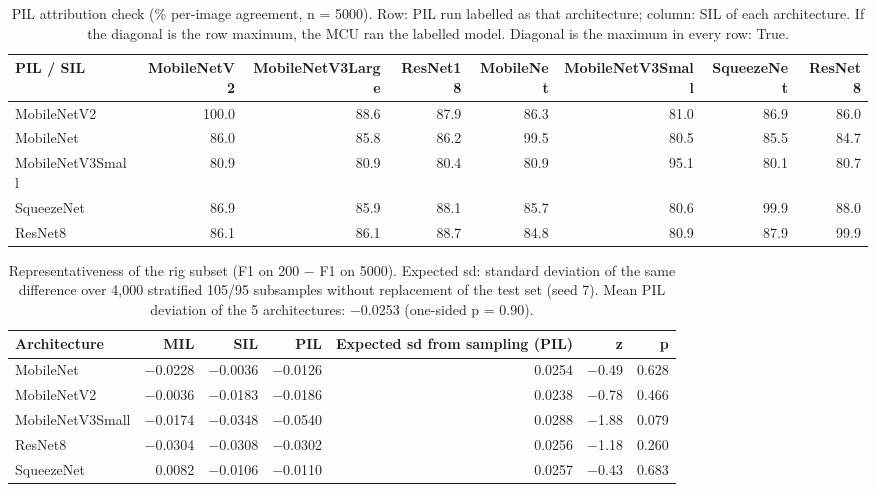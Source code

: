 \begin{table}[htbp]
\centering
\scriptsize
\caption{PIL attribution check (\% per-image agreement, n = 5000). Row: PIL run labelled as that architecture; column: SIL of each architecture. If the diagonal is the row maximum, the MCU ran the labelled model. Diagonal is the maximum in every row: True.}
\label{tab:ladder-coco-7}
\begin{tabular}{lrrrrrrr}
\toprule
PIL / SIL & MobileNetV2 & MobileNetV3Large & ResNet18 & MobileNet & MobileNetV3Small & SqueezeNet & ResNet8 \\
\midrule
MobileNetV2 & 100.0 & 88.6 & 87.9 & 86.3 & 81.0 & 86.9 & 86.0 \\
MobileNet & 86.0 & 85.8 & 86.2 & 99.5 & 80.5 & 85.5 & 84.7 \\
MobileNetV3Small & 80.9 & 80.9 & 80.4 & 80.9 & 95.1 & 80.1 & 80.7 \\
SqueezeNet & 86.9 & 85.9 & 88.1 & 85.7 & 80.6 & 99.9 & 88.0 \\
ResNet8 & 86.1 & 86.1 & 88.7 & 84.8 & 80.9 & 87.9 & 99.9 \\
\bottomrule
\end{tabular}
\end{table}

\begin{table}[htbp]
\centering
\scriptsize
\caption{Representativeness of the rig subset (F1 on 200 $-$ F1 on 5000). Expected sd: standard deviation of the same difference over 4,000 stratified 105/95 subsamples without replacement of the test set (seed 7). Mean PIL deviation of the 5 architectures: $-$0.0253 (one-sided p = 0.90).}
\label{tab:ladder-coco-8}
\begin{tabular}{lrrrrrr}
\toprule
Architecture & MIL & SIL & PIL & Expected sd from sampling (PIL) & z & p \\
\midrule
MobileNet & $-$0.0228 & $-$0.0036 & $-$0.0126 & 0.0254 & $-$0.49 & 0.628 \\
MobileNetV2 & $-$0.0036 & $-$0.0183 & $-$0.0186 & 0.0238 & $-$0.78 & 0.466 \\
MobileNetV3Small & $-$0.0174 & $-$0.0348 & $-$0.0540 & 0.0288 & $-$1.88 & 0.079 \\
ResNet8 & $-$0.0304 & $-$0.0308 & $-$0.0302 & 0.0256 & $-$1.18 & 0.260 \\
SqueezeNet & 0.0082 & $-$0.0106 & $-$0.0110 & 0.0257 & $-$0.43 & 0.683 \\
\bottomrule
\end{tabular}
\end{table}
